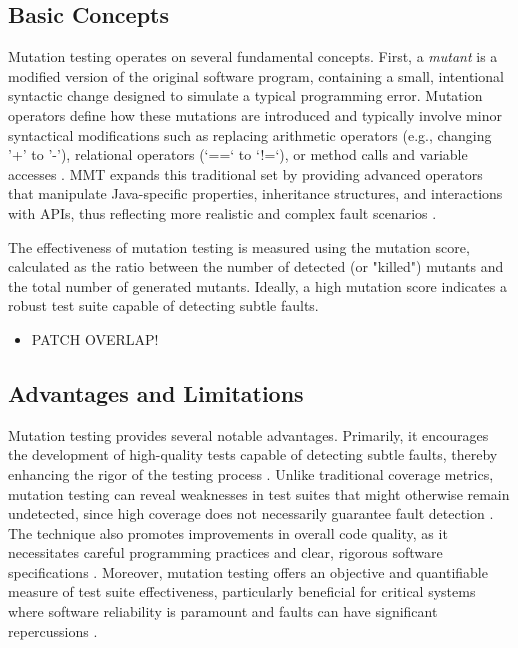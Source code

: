 \documentclass[sigplan, nonacm]{acmart}
\begin{document}
\subsection{Basic Concepts}
Mutation testing operates on several fundamental concepts. First, a \textit{mutant} is a modified version of the original software program, containing a small, intentional syntactic change designed to simulate a typical programming error. Mutation operators define how these mutations are introduced and typically involve minor syntactical modifications such as replacing arithmetic operators (e.g., changing '+' to '-'), relational operators (`==` to `!=`), or method calls and variable accesses \cite{offutt_mutation_2001}. MMT expands this traditional set by providing advanced operators that manipulate Java-specific properties, inheritance structures, and interactions with APIs, thus reflecting more realistic and complex fault scenarios \cite{bockisch_mmt_2024}.

The effectiveness of mutation testing is measured using the mutation score, calculated as the ratio between the number of detected (or "killed") mutants and the total number of generated mutants. Ideally, a high mutation score indicates a robust test suite capable of detecting subtle faults.

\begin{itemize}
	\item PATCH OVERLAP!
\end{itemize}

\subsection{Advantages and Limitations}

Mutation testing provides several notable advantages. Primarily, it encourages the development of high-quality tests capable of detecting subtle faults, thereby enhancing the rigor of the testing process \cite{jia_analysis_2011}. Unlike traditional coverage metrics, mutation testing can reveal weaknesses in test suites that might otherwise remain undetected, since high coverage does not necessarily guarantee fault detection \cite{jia_analysis_2011,bockisch_mmt_2024}. The technique also promotes improvements in overall code quality, as it necessitates careful programming practices and clear, rigorous software specifications \cite{offutt_mutation_2001}. Moreover, mutation testing offers an objective and quantifiable measure of test suite effectiveness, particularly beneficial for critical systems where software reliability is paramount and faults can have significant repercussions \cite{offutt_mutation_2001,jia_analysis_2011}.
\end{document}
